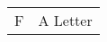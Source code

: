     \begin{table}[h]
        \begin{tabular}{@{}ll@{}}%
            F & A Letter\\
    \end{tabular}\label{tab:glossar}
    \end{table}